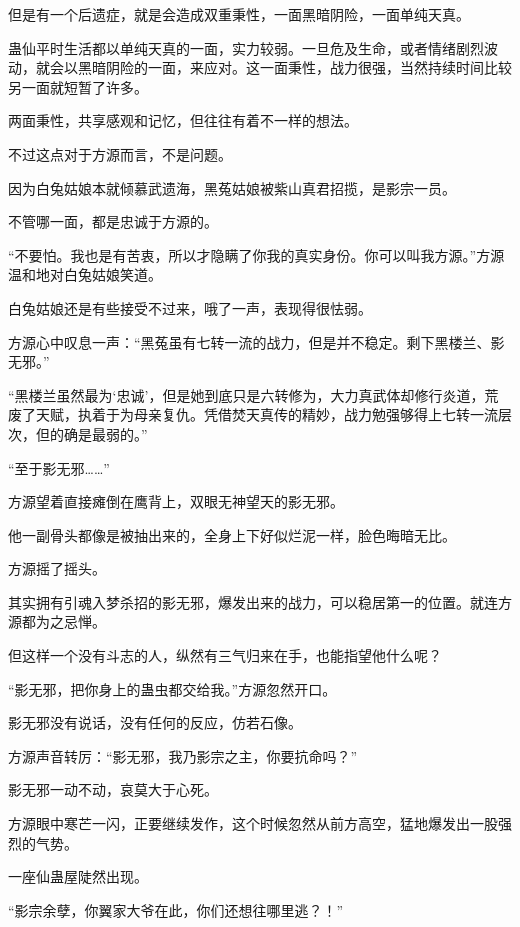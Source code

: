\begin{this_body}
但是有一个后遗症，就是会造成双重秉性，一面黑暗阴险，一面单纯天真。

蛊仙平时生活都以单纯天真的一面，实力较弱。一旦危及生命，或者情绪剧烈波动，就会以黑暗阴险的一面，来应对。这一面秉性，战力很强，当然持续时间比较另一面就短暂了许多。

两面秉性，共享感观和记忆，但往往有着不一样的想法。

不过这点对于方源而言，不是问题。

因为白兔姑娘本就倾慕武遗海，黑菟姑娘被紫山真君招揽，是影宗一员。

不管哪一面，都是忠诚于方源的。

“不要怕。我也是有苦衷，所以才隐瞒了你我的真实身份。你可以叫我方源。”方源温和地对白兔姑娘笑道。

白兔姑娘还是有些接受不过来，哦了一声，表现得很怯弱。

方源心中叹息一声：“黑菟虽有七转一流的战力，但是并不稳定。剩下黑楼兰、影无邪。”

“黑楼兰虽然最为‘忠诚’，但是她到底只是六转修为，大力真武体却修行炎道，荒废了天赋，执着于为母亲复仇。凭借焚天真传的精妙，战力勉强够得上七转一流层次，但的确是最弱的。”

“至于影无邪……”

方源望着直接瘫倒在鹰背上，双眼无神望天的影无邪。

他一副骨头都像是被抽出来的，全身上下好似烂泥一样，脸色晦暗无比。

方源摇了摇头。

其实拥有引魂入梦杀招的影无邪，爆发出来的战力，可以稳居第一的位置。就连方源都为之忌惮。

但这样一个没有斗志的人，纵然有三气归来在手，也能指望他什么呢？

“影无邪，把你身上的蛊虫都交给我。”方源忽然开口。

影无邪没有说话，没有任何的反应，仿若石像。

方源声音转厉：“影无邪，我乃影宗之主，你要抗命吗？”

影无邪一动不动，哀莫大于心死。

方源眼中寒芒一闪，正要继续发作，这个时候忽然从前方高空，猛地爆发出一股强烈的气势。

一座仙蛊屋陡然出现。

“影宗余孽，你翼家大爷在此，你们还想往哪里逃？！”

\end{this_body}

